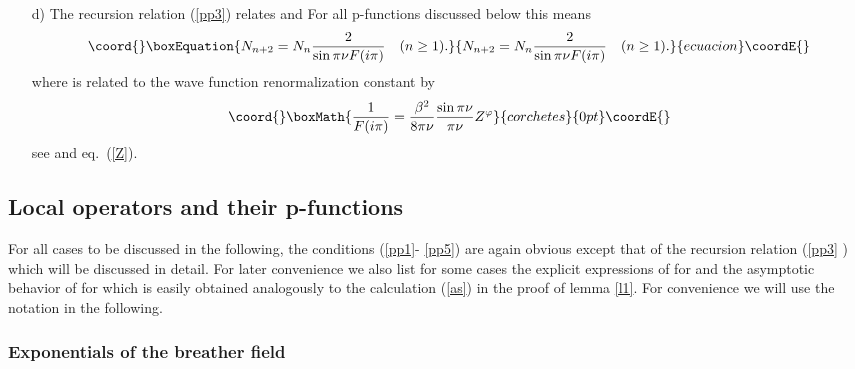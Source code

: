 \documentclass[a4paper,a4paper]{article}
\begin{document}
\begin{enumerate}
\item[d)]  The recursion relation (\ref{pp3}) relates \coordHE{} and \coordHE{}
For all p-functions discussed below this means 
\begin{equation}\coord{}\boxEquation{
N_{n+2}=N_{n}\frac{2}{\sin \pi \nu F(i\pi )}\quad (n\geq 1).  \label{N}
}{
N_{n+2}=N_{n}\frac{2}{\sin \pi \nu F(i\pi )}\quad (n\geq 1).  }{ecuacion}\coordE{}\end{equation}
where \coordHE{} is related to the wave function renormalization constant by 
\[\coord{}\boxMath{
\frac{1}{F(i\pi )}=\frac{\beta ^{2}}{8\pi \nu }\frac{\sin \pi \nu }{\pi \nu }%
Z^{\varphi } 
}{corchetes}{0pt}\coordE{}\]
see \cite{BK} and eq.~(\ref{Z}).
\end{enumerate}

\subsection{Local operators and their p-functions}

For all cases to be discussed in the following, the conditions (\ref{pp1}-%
\ref{pp5}) are again obvious except that of the recursion relation (\ref{pp3}%
) which will be discussed in detail. For later convenience we also list for
some cases the explicit expressions of \coordHE{} for \coordHE{} and the asymptotic behavior of \coordHE{} for \coordHE{} which is easily obtained
analogously to the calculation (\ref{as}) in the proof of lemma \ref{l1}.
For convenience we will use the notation \coordHE{} in the
following.

\subsubsection{Exponentials of the breather field}
\end{document}
